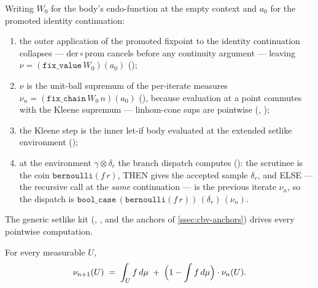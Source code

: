 \begin{lemma}\label{lem:cbv-reject-chain}
\rocqok
{}\rocqok
{}\rocqok
{}\rocqok
{}
Writing $W_0$ for the body's endo-function at the empty context and
$a_0$ for the promoted identity continuation:
\begin{enumerate}
  \item the outer application of the promoted fixpoint to the identity
    continuation collapses --- $\mathrm{der} \circ \mathrm{prom}$
    cancels before any continuity argument --- leaving
    $\nu = (\mathtt{fix\_value}\,W_0)(a_0)$
    ();
  \item $\nu$ is the unit-ball supremum of the per-iterate measures
    $\nu_n = (\mathtt{fix\_chain}\,W_0\,n)(a_0)$
    (), because
    evaluation at a point commutes with the Kleene supremum ---
    linhom-cone sups are pointwise
    (,
    );
  \item the Kleene step is the inner let-if body evaluated at the
    extended setlike environment
    ();
  \item at the environment $\gamma \otimes \delta_r$ the branch
    dispatch computes
    ():
    the scrutinee is the coin
    $\mathtt{bernoulli}(f\,r)$, THEN gives the accepted sample
    $\delta_r$, and ELSE --- the recursive call at the \emph{same}
    continuation --- is the previous iterate $\nu_n$, so the dispatch
    is
    $\mathtt{bool\_case}\,(\mathtt{bernoulli}(f\,r))\,
    (\delta_r)\,(\nu_n)$.
\end{enumerate}
The generic setlike kit
(,
, and the
anchors of \autoref{ssec:cbv-anchors}) drives every pointwise
computation.
\end{lemma}

\begin{lemma}%
\label{lem:cbv-reject-recurrence}
\rocqok
{}\rocqok
{}
For every measurable $U$,
\[
  \nu_{n+1}(U)
  \;=\;
  \int_U f\,d\mu
  \;+\;
  \Bigl(1 - \int f\,d\mu\Bigr)\cdot \nu_n(U).
\]
\end{lemma}

